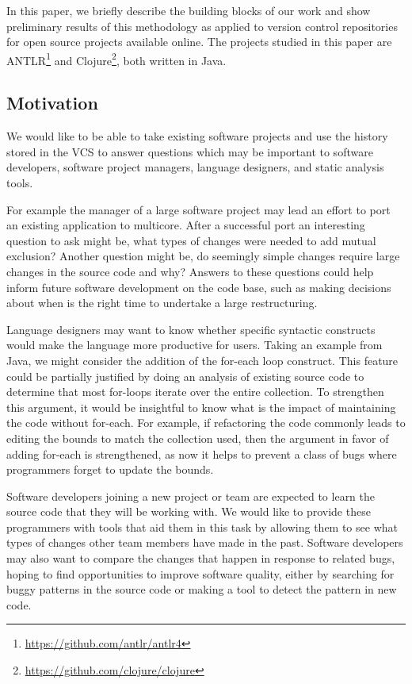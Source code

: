 In this paper, we briefly describe the building blocks of our work and show
preliminary results of this methodology as applied to version control
repositories for open source projects available online.  The projects studied
in this paper are ANTLR\footnote{\url{https://github.com/antlr/antlr4}} and
Clojure\footnote{\url{https://github.com/clojure/clojure}}, both written in
Java.

\subsection{Motivation}
\label{sec:motivation}
We would like to be able to take existing software projects and use the history
stored in the VCS to answer questions which may be important to software
developers, software project managers, language designers, and static analysis
tools.

For example the manager of a large software project may lead an effort to port
an existing application to multicore.  After a successful port an interesting
question to ask might be, what types of changes were needed to add mutual
exclusion? Another question might be, do seemingly simple changes require large
changes in the source code and why?  Answers to these questions could help
inform future software development on the code base, such as making decisions
about when is the right time to undertake a large restructuring.

Language designers may want to know whether specific syntactic constructs would
make the language more productive for users. Taking an example from Java, we
might consider the addition of the for-each loop construct. This feature
could be partially justified by doing an analysis of existing source code to
determine that most for-loops iterate over the entire collection. To strengthen
this argument, it would be insightful to know what is the impact of maintaining
the code without for-each. For example, if refactoring the code commonly
leads to editing the bounds to match the collection used, then the argument in
favor of adding for-each is strengthened, as now it helps to prevent a
class of bugs where programmers forget to update the bounds.

Software developers joining a new project or team are expected to learn the
source code that they will be working with. We would like to provide these
programmers with tools that aid them in this task by allowing them to see what
types of changes other team members have made in the past. Software developers
may also want to compare the changes that happen in response to related bugs,
hoping to find opportunities to improve software quality, either by searching
for buggy patterns in the source code or making a tool to detect the pattern in
new code.

